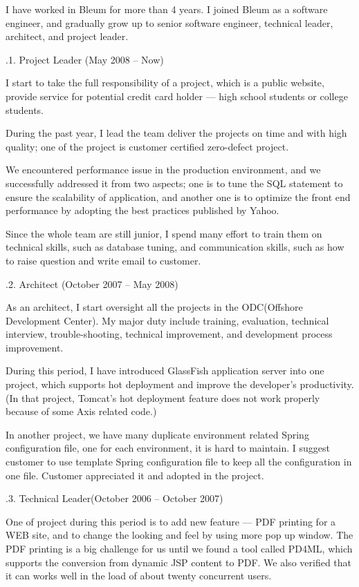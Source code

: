 \noindent
I have worked in Bleum for more than 4 years. I joined Bleum as a software  
engineer, and gradually grow up to senior software engineer, technical leader,
architect, and project leader. 

\smallskip\noindent
{}.1. Project Leader (May 2008 -- Now)\par
\noindent
I start to take the full responsibility of a project, which is a public website, provide service for 
potential credit card holder --- high school students or college students. 

During the past year, I lead the team deliver the projects on time and with high quality;
one of the project is customer certified zero-defect project.

We encountered performance issue in the production environment, and we successfully
addressed it from two aspects; one is to tune the SQL statement to ensure the scalability
of application, and another one is to optimize the front end performance by adopting
the best practices published by Yahoo.
  
Since the whole team are still junior, I spend many effort to train them on 
technical skills, such as database tuning, and communication skills, such as
how to raise question and write email to customer.

\smallskip\noindent
{}.2. Architect (October 2007 -- May 2008)\par
\noindent
As an architect, I start oversight all the projects in the ODC(Offshore Development Center).
My major duty include training, evaluation, technical interview, trouble-shooting,
 technical improvement, and development process improvement. 

During this period, I have introduced GlassFish application server into one project, which 
supports hot deployment and improve the developer's productivity. (In that project, Tomcat's
hot deployment feature does not work properly because of some Axis related code.)

In another project, we have many duplicate environment related Spring configuration file, one for 
each environment, it is hard to maintain. I suggest customer to use template Spring configuration file
to keep all the configuration in one file. Customer appreciated it and adopted in the project.

.3. Technical Leader(October 2006 -- October 2007)\par
\noindent
One of project during this period is to add new feature --- PDF printing for a WEB site, and to
change the looking and feel by using more pop up window. The PDF printing 
is a big challenge for us until we found a tool called PD4ML, which supports
the conversion from dynamic JSP content to PDF. We also verified that it can 
works well in the load of about twenty concurrent users. 


